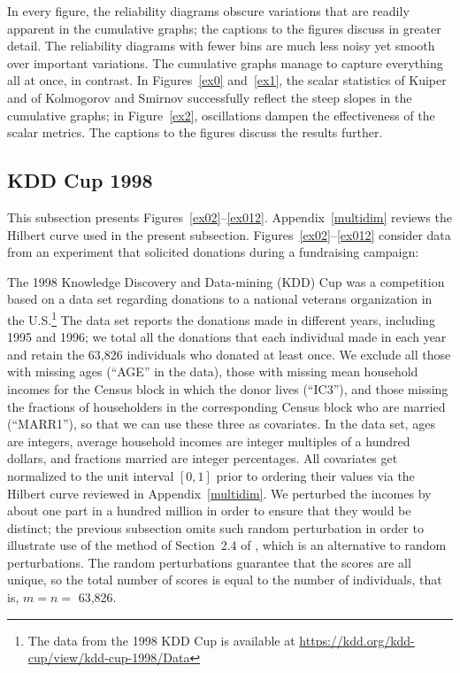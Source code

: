 \documentclass{article}
\begin{document}
In every figure, the reliability diagrams obscure variations
that are readily apparent in the cumulative graphs;
the captions to the figures discuss in greater detail.
The reliability diagrams with fewer bins are much less noisy
yet smooth over important variations.
The cumulative graphs manage to capture everything all at once, in contrast.
In Figures~\ref{ex0} and~\ref{ex1}, the scalar statistics
of Kuiper and of Kolmogorov and Smirnov successfully reflect
the steep slopes in the cumulative graphs;
in Figure~\ref{ex2}, oscillations dampen the effectiveness
of the scalar metrics. The captions to the figures discuss the results further.


\subsection{KDD Cup 1998}
\label{kddcup}

This subsection presents Figures~\ref{ex02}--\ref{ex012}.
Appendix~\ref{multidim} reviews the Hilbert curve used
in the present subsection. Figures~\ref{ex02}--\ref{ex012} consider data
from an experiment that solicited donations during a fundraising campaign:

The 1998 Knowledge Discovery and Data-mining (KDD) Cup was a competition
based on a data set regarding donations to a national veterans organization
in the U.S.\footnote{The data from the 1998 KDD Cup is available
at \url{https://kdd.org/kdd-cup/view/kdd-cup-1998/Data}}
The data set reports the donations made in different years,
including 1995 and 1996; we total all the donations that each individual made
in each year and retain the 63,826 individuals who donated at least once.
We exclude all those with missing ages (``AGE'' in the data),
those with missing mean household incomes for the Census block
in which the donor lives (``IC3''), and those missing the fractions
of householders in the corresponding Census block who are married (``MARR1''),
so that we can use these three as covariates.
In the data set, ages are integers, average household incomes
are integer multiples of a hundred dollars, and fractions married
are integer percentages. All covariates get normalized to the unit interval
$[0, 1]$ prior to ordering their values via the Hilbert curve
reviewed in Appendix~\ref{multidim}.
We perturbed the incomes by about one part in a hundred million
in order to ensure that they would be distinct;
the previous subsection omits such random perturbation
in order to illustrate use of the method of Section~2.4 of \cite{tygert_pvals},
which is an alternative to random perturbations.
The random perturbations guarantee that the scores are all unique,
so the total number of scores is equal to the number of individuals, that is,
$m = n =$ 63,826.
\end{document}
